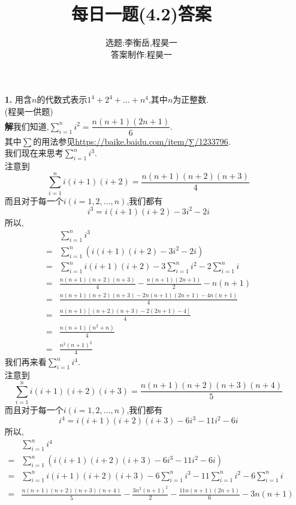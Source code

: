 \documentclass[UTF8]{ctexart}
\title{每日一题(4.2)答案}
\author{选题:李衡岳,程昊一\\答案制作:程昊一}
\begin{document}
\maketitle
\begin{itemize}
\item[\textbf{1.}]{用含$n$的代数式表示$1^4+2^4+\dots+n^4$,其中$n$为正整数.\\
(程昊一供题)}\\
\hspace*{2em}\textbf{解}\quad 我们知道,$\sum\limits_{i=1}^{n}i^2=\dfrac{n(n+1)(2n+1)}{6}$.\\其中$\sum$的用法参见\uline{https://baike.baidu.com/item/∑/1233796}.\\
\hspace*{2em}我们现在来思考$\sum\limits_{i=1}^{n}i^3$.\\
\hspace*{2em}注意到\[\sum\limits_{i=1}^{n}i(i+1)(i+2)=\dfrac{n(n+1)(n+2)(n+3)}{4}\]
而且对于每一个$i(i=1,2,\dots ,n)$,我们都有
\[i^3=i(i+1)(i+2)-3i^2-2i\]
所以,
\begin{align*}
&\sum\limits_{i=1}^{n}i^3\\
=&\sum\limits_{i=1}^{n}(i(i+1)(i+2)-3i^2-2i)\\
=&\sum\limits_{i=1}^{n}i(i+1)(i+2)-3\sum\limits_{i=1}^{n}i^2-2\sum\limits_{i=1}^{n}i\\
=&\frac{n(n+1)(n+2)(n+3)}{4}-\frac{n(n+1)(2n+1)}{2}-n(n+1)\\
=&\frac{n(n+1)(n+2)(n+3)-2n(n+1)(2n+1)-4n(n+1)}{4}\\
=&\frac{n(n+1)[(n+2)(n+3)-2(2n+1)-4]}{4}\\
=&\frac{n(n+1)(n^2+n)}{4}\\
=&\frac{n^2(n+1)^2}{4}
\end{align*}
\hspace*{2em}我们再来看$\sum\limits_{i=1}^{n}i^4$.\\
\hspace*{2em}注意到\[\sum\limits_{i=1}^{n}i(i+1)(i+2)(i+3)=\frac{n(n+1)(n+2)(n+3)(n+4)}{5}\]
而且对于每一个$i(i=1,2,\dots,n)$,我们都有
\[i^4=i(i+1)(i+2)(i+3)-6i^3-11i^2-6i\]
所以,
\begin{align*}
&\sum\limits_{i=1}^{n}i^4\\
=&\sum\limits_{i=1}^{n}(i(i+1)(i+2)(i+3)-6i^3-11i^2-6i)\\
=&\sum\limits_{i=1}^{n}i(i+1)(i+2)(i+3)-6\sum\limits_{i=1}^{n}i^3-11\sum\limits_{i=1}^{n}i^2-6\sum\limits_{i=1}^{n}i\\
=&\frac{n(n+1)(n+2)(n+3)(n+4)}{5}-\frac{3n^2(n+1)^2}{2}-\frac{11n(n+1)(2n+1)}{6}-3n(n+1)\\

\end{align*}
\end{itemize}
\end{document}
